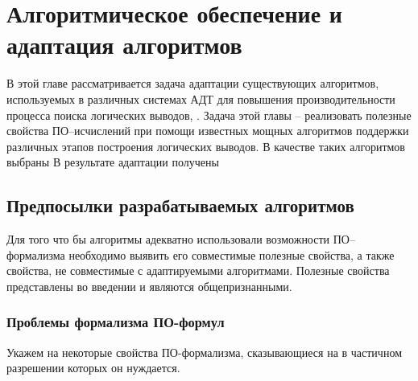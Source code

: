 \chapter{Алгоритмическое обеспечение и адаптация алгоритмов}

В этой главе рассматривается задача адаптации существующих алгоритмов,
используемых в различных системах АДТ для повышения производительности
процесса поиска логических выводов, . Задача этой главы -- реализовать
полезные свойства ПО--исчислений при помощи известных мощных
алгоритмов поддержки различных этапов построения логических выводов. В
качестве таких алгоритмов выбраны  В результате адаптации получены

\section{Предпосылки разрабатываемых алгоритмов}

Для того что бы алгоритмы адекватно использовали возможности
ПО--формализма необходимо выявить его совместимые полезные свойства, а также свойства, не совместимые с адаптируемыми алгоритмами.  Полезные свойства представлены во введении и являются общепризнанными.

\subsection{Проблемы формализма ПО-формул}
Укажем на некоторые свойства ПО-формализма, сказывающиеся на
 в частичном разрешении которых он нуждается.

